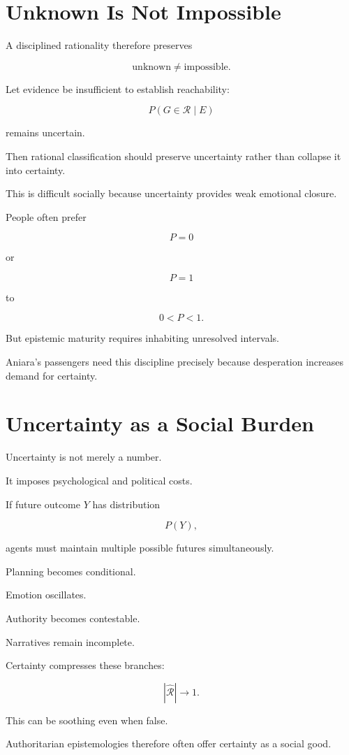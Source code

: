 \documentclass[11pt,oneside]{book}
\theoremstyle{definition}
\theoremstyle{remark}
\newcommand{\R}{\mathcal{R}}
\begin{document}
\section{Unknown Is Not Impossible}

A disciplined rationality therefore preserves

\[
\text{unknown}
\neq
\text{impossible}.
\]

Let evidence be insufficient to establish reachability:

\[
P(G\in\R\mid E)
\]

remains uncertain.

Then rational classification should preserve uncertainty rather than collapse it into certainty.

This is difficult socially because uncertainty provides weak emotional closure.

People often prefer

\[
P=0
\]

or

\[
P=1
\]

to

\[
0<P<1.
\]

But epistemic maturity requires inhabiting unresolved intervals.

Aniara's passengers need this discipline precisely because desperation increases demand for certainty.

\section{Uncertainty as a Social Burden}

Uncertainty is not merely a number.

It imposes psychological and political costs.

If future outcome \(Y\) has distribution

\[
P(Y),
\]

agents must maintain multiple possible futures simultaneously.

Planning becomes conditional.

Emotion oscillates.

Authority becomes contestable.

Narratives remain incomplete.

Certainty compresses these branches:

\[
|\widehat{\R}|\rightarrow1.
\]

This can be soothing even when false.

Authoritarian epistemologies therefore often offer certainty as a social good.
\end{document}
